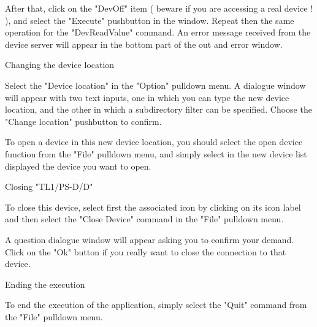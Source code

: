 After that, click on the "DevOff" item ( beware if you are accessing a  
real device ! ), and select the "Execute"  
pushbutton in the window. Repeat then the same operation for the 
"DevReadValue" command.
An error message received from the device server will appear in the bottom part of the out and error window.


	{Changing the device location}

Select the "Device location" in the "Option" pulldown menu. A dialogue
window will appear with two text inputs, one in which you can type the new device location, and the other in which a subdirectory filter can be specified.
Choose the "Change location" pushbutton to confirm.

To open a device in this new device location, you should select the open
device function from the "File" pulldown menu, and simply select in the new
device list displayed the device you want to open.


	{Closing "TL1/PS-D/D"}

To close this device, select first the associated icon by clicking on its icon label and then select the "Close Device" command in the "File" pulldown menu. 

A question dialogue window will appear asking you to confirm your demand.
Click on the "Ok" button if you really want to close the connection to
that device.


	{Ending the execution}

To end the execution of the application, simply select the "Quit" command
from the "File" pulldown menu.


